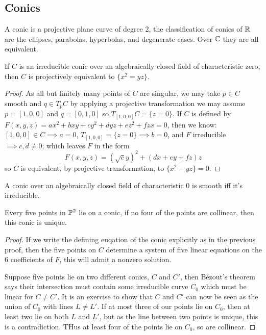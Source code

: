 \documentclass{article}
\begin{document}
\subsection{Conics}

A conic is a projective plane curve of degree $2$, the classification of conics of $\mathbb{R}$ are the ellipses, parabolas, hyperbolas, and degenerate cases. Over $\mathbb{C}$ they are all equivalent.

\begin{theorem}
    If $C$ is an irreducible conic over an algebraically closed field of characteristic zero, then $C$ is projectively equivalent to $\{x^2=yz\}$.\begin{proof}
        As all but finitely many points of $C$ are singular, we may take $p\in C$ smooth and  $q\in T_pC$ by applying a projective transformation we may assume $p = [1,0,0]$ and $q = [0,1,0]$ so $T_{[1,0,0]}C = \{z=0\}$. If $C$ is defined by $F(x,y,z) = ax^2 + bxy + cy^2 + dyz + ez^2 + fzx=0$, then we know: $[1,0,0]\in C \implies a=0$, $T_{[1,0,0]}=\{z=0\}\implies b=0$, and $F$ irreducible $\implies c,d\neq 0$; which leaves $F$ in the form \[
        F(x,y,z) = (\sqrt{c}y)^2 + (dx+ey+fz)z
        \] so $C$ is equivalent, by projective transformation, to $\{x^2-yz\}=0$.
    \end{proof}
\end{theorem}

\begin{corollary}
    A conic over an algebraically closed field of characteristic 0 is smooth iff it's irreducible.
\end{corollary}

\begin{proposition}
    Every five points in $\mathbb{P}^2$ lie on a conic, if no four of the points are collinear, then this conic is unique.
    \begin{proof}
        If we write the defining euqation of the conic explicitly as in the previous proof, then the five points on $C$ determine a system of five linear equations on the 6 coefficients of $F$, this will admit a nonzero solution.

        Suppose five points lie on two different conics, $C$ and $C'$, then B\'ezout's theorem says their intersection must contain some irreducible curve $C_0$ which must be linear for $C\neq C'$. It is an exercise to show that $C$ and $C'$ can now be seen as the union of $C_0$ with lines $L\neq L'$. If at most three of our points lie on $C_0$, then at least two lie on both $L$ and $L'$, but as the line between two points is unique, this is a contradiction. THus at least four of the points lie on $C_0$, so are collinear.
    \end{proof}
\end{proposition}
\end{document}
